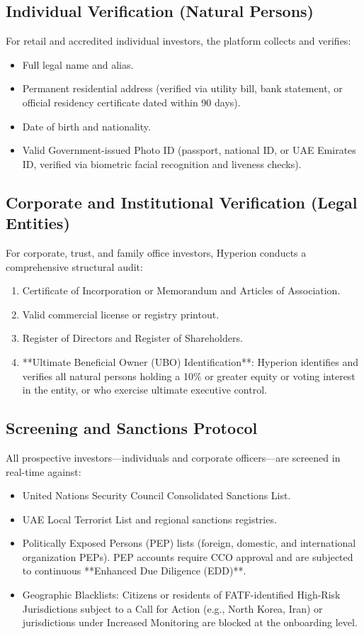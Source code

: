 \documentclass[11pt]{article}
\begin{document}
\subsection{Individual Verification (Natural Persons)}
For retail and accredited individual investors, the platform collects and verifies:
\begin{itemize}
    \item Full legal name and alias.
    \item Permanent residential address (verified via utility bill, bank statement, or official residency certificate dated within 90 days).
    \item Date of birth and nationality.
    \item Valid Government-issued Photo ID (passport, national ID, or UAE Emirates ID, verified via biometric facial recognition and liveness checks).
\end{itemize}

\subsection{Corporate and Institutional Verification (Legal Entities)}
For corporate, trust, and family office investors, Hyperion conducts a comprehensive structural audit:
\begin{enumerate}
    \item Certificate of Incorporation or Memorandum and Articles of Association.
    \item Valid commercial license or registry printout.
    \item Register of Directors and Register of Shareholders.
    \item **Ultimate Beneficial Owner (UBO) Identification**: Hyperion identifies and verifies all natural persons holding a 10\% or greater equity or voting interest in the entity, or who exercise ultimate executive control.
\end{enumerate}

\subsection{Screening and Sanctions Protocol}
All prospective investors—individuals and corporate officers—are screened in real-time against:
\begin{itemize}
    \item United Nations Security Council Consolidated Sanctions List.
    \item UAE Local Terrorist List and regional sanctions registries.
    \item Politically Exposed Persons (PEP) lists (foreign, domestic, and international organization PEPs). PEP accounts require CCO approval and are subjected to continuous **Enhanced Due Diligence (EDD)**.
    \item Geographic Blacklists: Citizens or residents of FATF-identified High-Risk Jurisdictions subject to a Call for Action (e.g., North Korea, Iran) or jurisdictions under Increased Monitoring are blocked at the onboarding level.
\end{itemize}
\end{document}
